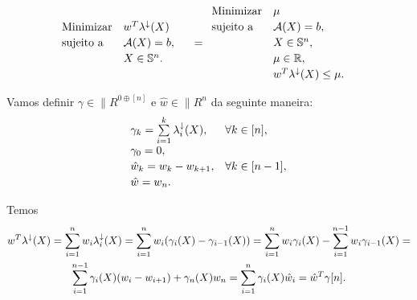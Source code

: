 \begin{homeworkProblemAnswer}
\begin{equation}\label{eq:prob_ex2}
    \begin{array}[!h]{lll}
        \text{Minimizar} & w^T \eigen(X)                                    & \\[2pt]
        \text{sujeito a} & \"{A}(X) = b,                                    & \\[2pt]
                         & X \in \|{S}^n.                                   & \\
    \end{array}
    =
    \begin{array}[!h]{lll}
        \text{Minimizar} & \mu                                              & \\[2pt]
        \text{sujeito a} & \"{A}(X) = b,                                    & \\[2pt]
                         & X \in \|{S}^n,                                   & \\[2pt]
                         & \mu \in \|{R},                                   & \\[2pt]
                         & w^T \eigen(X) \leq \mu.                          & \\
    \end{array}
\end{equation}

Vamos definir $\gamma \in \|{R}^{0 \oplus [n]}$ e $\hat{w} \in \|{R}^n$ da seguinte maneira:
\begin{equation*}
    \begin{array}[!h]{ll}
        \gamma_k = \sum \limits_{i=1}^k \eigen_i(X), & \forall k \in [n], \\[2pt]
        \gamma_0 = 0,                                & \\[2pt]
        \hat{w}_k = w_k - w_{k+1},                   & \forall k \in [n-1], \\[2pt]
        \hat{w} = w_n.                               & \\
    \end{array}
\end{equation*}

Temos
\begin{multline*}  
    w^T \lambda^{\downarrow}(X) = 
    \sum \limits_{i=1}^n w_i \lambda^{\downarrow}_i(X) = 
    \sum \limits_{i=1}^n w_i (\gamma_i(X) - \gamma_{i-1}(X)) = 
    \sum \limits_{i=1}^n w_i \gamma_i(X) - \sum \limits_{i=1}^{n-1} w_i \gamma_{i-1}(X) = \\
    \sum \limits_{i=1}^{n-1} \gamma_i(X)(w_i - w_{i+1}) + \gamma_n(X)w_n =
    \sum \limits_{i=1}^n \gamma_i(X) \hat{w}_i =
    \hat{w}^T \gamma[n].
\end{multline*}


\end{homeworkProblemAnswer}
